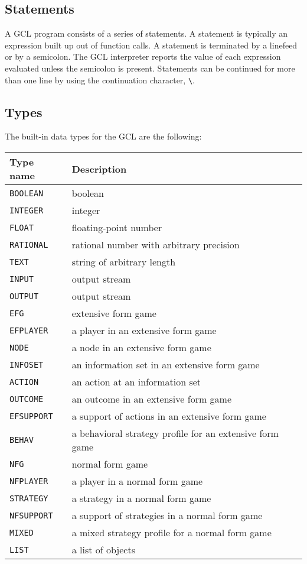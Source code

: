 \subsection{Statements}

A GCL program consists of a series of statements.  A statement is
typically an expression built up out of function calls.  A statement
is terminated by a linefeed or by a semicolon.  The GCL interpreter
reports the value of each expression evaluated unless the semicolon is
present. Statements can be continued for more than one line by using
the continuation character, \verb+\+.   

\subsection{Types}

The built-in data types for the GCL are the following:  

\medskip

\begin{tabular} {|l||l|} \hline
Type name	& Description \\ \hline
{\tt BOOLEAN} 	& boolean \\
{\tt INTEGER} 	& integer \\ 
{\tt FLOAT} 	& floating-point number \\
{\tt RATIONAL} 	& rational number with arbitrary precision \\
{\tt TEXT}	& string of arbitrary length \\
{\tt INPUT}	& output stream \\
{\tt OUTPUT}	& output stream \\ \hline
{\tt EFG}	& extensive form game \\
{\tt EFPLAYER}	& a player in an extensive form game \\
{\tt NODE}	& a node in an extensive form game \\ 
{\tt INFOSET}	& an information set in an extensive form game \\
{\tt ACTION}	& an action at an information set \\
{\tt OUTCOME}	& an outcome in an extensive form game \\
{\tt EFSUPPORT}	& a support of actions in an extensive form game \\
{\tt BEHAV}	& a behavioral strategy profile for an extensive form game \\ \hline
{\tt NFG}	& normal form game \\
{\tt NFPLAYER}	& a player in a normal form game \\
{\tt STRATEGY}	& a strategy in a normal form game \\
{\tt NFSUPPORT}	& a support of strategies in a normal form game \\
{\tt MIXED}	& a mixed strategy profile for a normal form game \\ \hline
{\tt LIST}	& a list of objects \\ \hline
\end{tabular}

